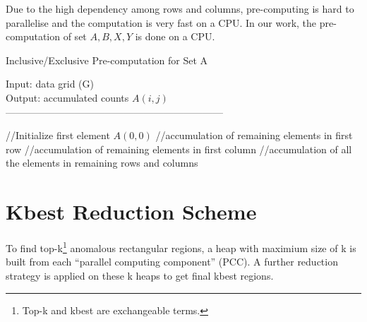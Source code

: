 \documentclass[AMA,LATO1COL]{WileyNJD-v2}
\begin{document}
Due to the high dependency among rows and columns, pre-computing is hard to parallelise and the computation is very fast on a CPU. In our work, the pre-computation of set $A, B, X, Y$ is done on a CPU.

\begin{algorithm}[t!]
\caption{Inclusive/Exclusive Pre-computation for Set A}\label{preinex}
Input: data grid (G) \\
Output: accumulated counts $A(i,j)$\\
------------------------------------------------------------------ \\
\begin{algorithmic}[1]
\State //Initialize first element $A(0,0)$
\State //accumulation of remaining elements in first row
\EndFor
\State //accumulation of remaining elements in first column
\EndFor
\State //accumulation of all the elements in remaining rows and columns
\EndFor
{}
\EndFor
\EndFor
\end{algorithmic}
\end{algorithm}
\section{ Kbest Reduction Scheme}\label{KBEST}
To find top-k\footnote{Top-k and kbest are exchangeable terms.} anomalous rectangular regions, a heap with maximium size of k is built from each ``parallel computing component'' (PCC). A further reduction strategy is applied on these k heaps to get final kbest regions.
\end{document}
